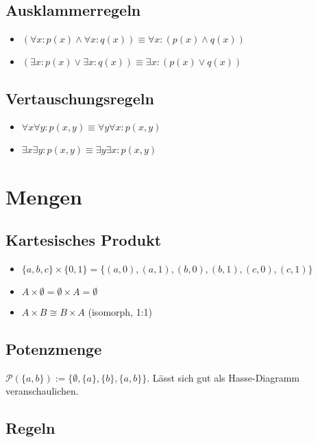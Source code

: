 \documentclass[10pt,a4paper,twoside,twocolumn]{article}
\begin{document}
	\subsection{Ausklammerregeln}
	\begin{itemize}
		\setlength\itemsep{0em}
		\item $ (\forall x: p(x) \land \forall x : q(x)) \equiv \forall x : (p(x) \land q(x)) $
		\item $ (\exists x: p(x) \lor \exists x : q(x)) \equiv \exists x : (p(x) \lor q(x)) $
	\end{itemize}
	
	\subsection{Vertauschungsregeln}
	\begin{itemize}
		\setlength\itemsep{0em}
		\item $ \forall x \forall y : p(x, y) \equiv \forall y \forall x : p(x, y) $
		\item $ \exists x \exists y : p(x, y) \equiv \exists y \exists x : p(x, y) $
	\end{itemize}
	
	
	\section{Mengen}
	
	\subsection{Kartesisches Produkt}
	
	\begin{itemize}
		\setlength\itemsep{0em}
		\item $ \{ a, b, c \} \times \{ 0, 1 \} = \{ (a, 0), (a, 1), (b, 0), (b, 1), (c, 0), (c, 1) \} $
		\item $ A \times \emptyset = \emptyset \times A = \emptyset $
		\item $ A \times B \cong B \times A $ (isomorph, 1:1)
	\end{itemize}
		
	\subsection{Potenzmenge}
	$ \mathcal{P}(\{a, b\}) := \{ \emptyset, \{a\}, \{b\}, \{a, b\} \} $. Lässt sich gut als Hasse-Diagramm veranschaulichen.
	
	\subsection{Regeln}
	
\end{document}
